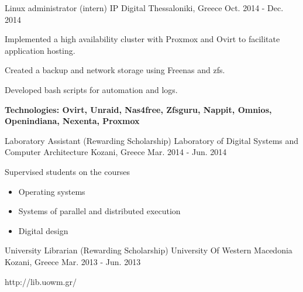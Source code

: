 \begin{cventries}

\cventry
{Linux administrator (intern)} %
{IP Digital} %
{Thessaloniki, Greece} %
{Oct. 2014 - Dec. 2014} %
{ %
\begin{cvitems}
\item {Implemented a high availability cluster with Proxmox and Ovirt to facilitate application hosting.}
\item {Created a backup and network storage using Freenas and zfs.}
\item {Developed bash scripts for automation and logs.}
\item {\bfseries{Technologies:} Ovirt, Unraid, Nas4free, Zfsguru, Nappit, Omnios, Openindiana, Nexenta, Proxmox}
\end{cvitems}
}


\cventry
{Laboratory Assistant (Rewarding Scholarship)} %
{Laboratory of Digital Systems and Computer Architecture} %
{Kozani, Greece} %
{Mar. 2014 - Jun. 2014} %
{ %
\begin{cvitems}
\item {Supervised students on the courses}
\begin{itemize}
\item {Operating systems}
\item {Systems of parallel and distributed execution}
\item {Digital design}
\end{itemize}
\end{cvitems}
}


\cventry
{University Librarian (Rewarding Scholarship)} %
{University Of Western Macedonia} %
{Kozani, Greece} %
{Mar. 2013 - Jun. 2013} %
{ %
\begin{cvitems}
\item {http://lib.uowm.gr/}
\end{cvitems}
}


\end{cventries}
